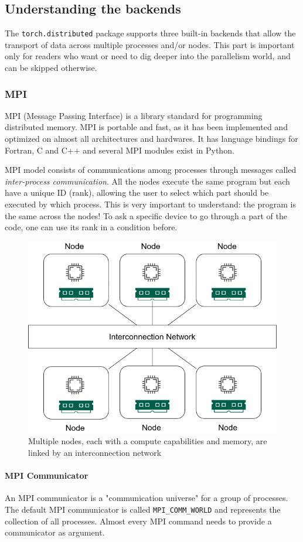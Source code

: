 \documentclass{article}
\begin{document}
\subsection{Understanding the backends}
The \lstinline{torch.distributed} package supports three built-in backends that allow the transport of data across multiple processes and/or nodes. This part is important only for readers who want or need to dig deeper into the parallelism world, and can be skipped otherwise.

\subsubsection{MPI}
MPI (Message Passing Interface) is a library standard for programming distributed memory. MPI is portable and fast, as it has been implemented and optimized on almost all architectures and hardwares. It has language bindings for Fortran, C and C++ and several MPI modules exist in Python.

MPI model consists of communications among processes through messages called \textit{inter-process communication}. All the nodes execute the same program but each have a unique ID (rank), allowing the user to select which part should be executed by which process. This is very important to understand: the program is the same across the nodes! To ask a specific device to go through a part of the code, one can use its rank in a condition before.

\begin{figure}[h!]
  \center
  \includegraphics[width=0.5\linewidth]{images/2022-08-25-11-00-37.png}
  \caption{Multiple nodes, each with a compute capabilities and memory, are linked by an interconnection network}
\end{figure}
\FloatBarrier

\paragraph{MPI Communicator}
An MPI communicator is a "communication universe" for a group of processes. The default MPI communicator is called \lstinline{MPI_COMM_WORLD} and represents the collection of all processes. Almost every MPI command needs to provide a communicator as argument.
\end{document}
